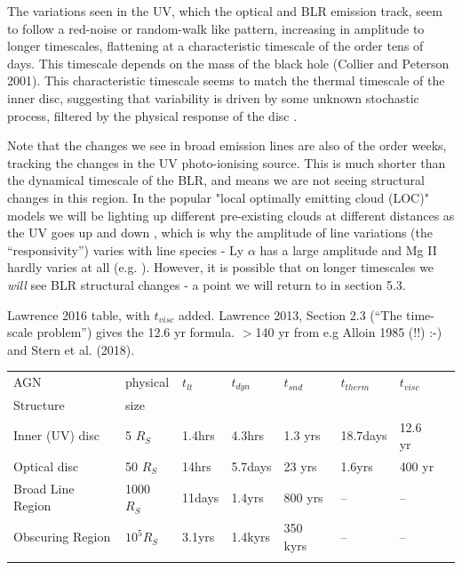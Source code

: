 \documentclass[11pt]{article}
\begin{document}
The variations seen in the UV, which the optical and BLR emission track, seem to follow a red-noise or random-walk like pattern, increasing in amplitude to longer timescales, flattening at a characteristic timescale of the order tens of days. This timescale depends on the mass of the black hole (Collier and Peterson 2001). This characteristic timescale seems to match the thermal timescale of the inner disc, suggesting that variability is driven by some unknown stochastic process, filtered by the physical response of the disc \citep{Kelly2009, Kelly2011}.

Note that the changes we see in broad emission lines are also of the order weeks, tracking the changes in the UV photo-ionising source. This is much shorter than the dynamical timescale of the BLR, and means we are not seeing structural changes in this region. In the popular "local optimally emitting cloud (LOC)" models we will be lighting up different pre-existing clouds at different distances as the UV goes up and down \citep{Peterson2006,Goad2014}, which is why the amplitude of line variations (the ``responsivity'') varies with line species - Ly $\alpha$ has a large amplitude and Mg II hardly varies at all (e.g. \citet{Cackett2015}). However, it is possible that on longer timescales we {\em will} see BLR structural changes - a point we will return to in section 5.3.

Lawrence 2016 table, with $t_{visc}$ added. 
Lawrence 2013, Section 2.3 (``The time-scale problem'') gives the 12.6 yr formula. 
$>$140 yr from e.g Alloin 1985 (!!) :-) and Stern et al. (2018). 
\begin{table}[!ht]
\begin{center}
\smallskip
{\small
\begin{tabular}{llllllll}  %

\hline
\hline
\noalign{\smallskip}
AGN             &  physical              &  $t_{lt}$  & $t_{dyn}$  & $t_{snd}$     & $t_{therm}$ & $t_{visc}$ \\
\noalign{\smallskip}
Structure     &    size                   &               &                &                  & & \\
\noalign{\smallskip}
\hline

\noalign{\smallskip}
Inner (UV) disc         & 5 $R_S$         & 1.4hrs & 4.3hrs & 1.3 yrs     & 18.7days  & 12.6 yr \\
\noalign{\smallskip}
Optical disc             & 50 $R_S$       & 14hrs & 5.7days & 23 yrs     & 1.6yrs &  400 yr \\
\noalign{\smallskip}
Broad Line Region    & 1000 $R_S$    & 11days & 1.4yrs & 800 yrs    & -- &  -- \\
\noalign{\smallskip}
Obscuring Region   & $10^5 R_S$      & 3.1yrs & 1.4kyrs & 350 kyrs & --  & -- \\
\noalign{\smallskip}
\hline  
\hline
\end{tabular}
}
\end{center}
\end{table}
\end{document}
